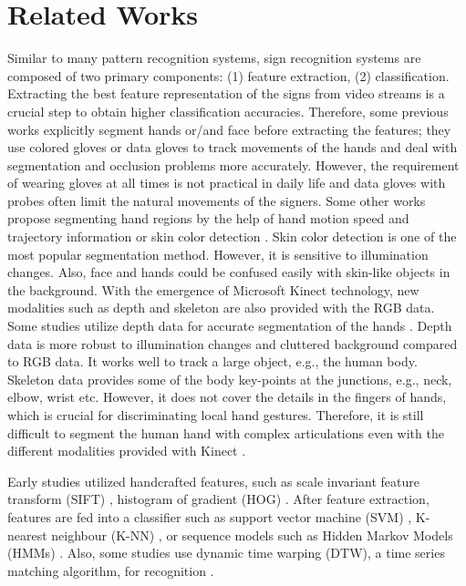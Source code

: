 \documentclass[11pt, a4paper, singlecolumn]{article}
\begin{document}
\section{Related Works}
\label{sec:RelatedWorks}
Similar to many pattern recognition systems, sign recognition systems are composed of two primary components: (1) feature extraction, (2) classification. Extracting the best feature representation of the signs from video streams is a crucial step to obtain higher classification accuracies. Therefore, some previous works explicitly segment hands or/and face before extracting the features; they use colored gloves \cite{grobel1997isolated, lamberti2011real, han2009modelling, ronchetti2016lsa64, cooper2012sign, zafrulla2011american} or data gloves \cite{shukor2015new} to track movements of the hands and deal with segmentation and occlusion problems more accurately. However, the requirement of wearing gloves at all times is not practical in daily life and data gloves with probes often limit the natural movements of the signers. Some other works propose segmenting hand regions by the help of hand motion speed and trajectory information \cite{han2009modelling, cooper2012sign} or skin color detection \cite{dardas2011real, yang2010chinese}. Skin color detection is one of the most popular segmentation method. However, it is sensitive to illumination changes. Also, face and hands could be confused easily with skin-like objects in the background. With the emergence of Microsoft Kinect technology, new modalities such as depth and skeleton are also provided with the RGB data. Some studies utilize depth data for accurate segmentation of the hands \cite{suarez2012hand, ren2013robust}. Depth data is more robust to illumination changes and cluttered background compared to RGB data. It works well to track a large object, e.g., the human body. Skeleton data provides some of the body key-points at the junctions, e.g., neck, elbow, wrist etc. However, it does not cover the details in the fingers of hands, which is crucial for discriminating local hand gestures. Therefore, it is still difficult to segment the human hand with complex articulations even with the different modalities provided with Kinect \cite{ren2013robust}.


Early studies utilized handcrafted features, such as scale invariant feature transform (SIFT) \cite{dardas2011real, yang2010chinese}, histogram of gradient (HOG) \cite{han2009modelling, cooper2012sign, jangyodsuk2014sign}. After feature extraction, features are fed into a classifier such as support vector machine (SVM) \cite{dardas2011real, yang2010chinese}, K-nearest neighbour (K-NN) \cite{memics2013kinect}, or sequence models such as Hidden Markov Models (HMMs) \cite{grobel1997isolated, ronchetti2016lsa64, cooper2012sign, zafrulla2011american}. Also, some studies use dynamic time warping (DTW), a time series matching algorithm, for recognition \cite{han2009modelling, jangyodsuk2014sign}. 
\end{document}
